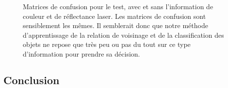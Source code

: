 \documentclass[a4paper, onecolumn, 11pt]{article}
\begin{document}
\begin{figure}[p]
    \centering
    \qquad
    \caption{Matrices de confusion pour le test, avec et sans l'information de couleur et de réflectance laser. Les matrices de confusion sont sensiblement les mêmes. Il semblerait donc que notre méthode d'apprentissage de la relation de voisinage et de la classification des objets ne repose que très peu ou pas du tout sur ce type d'information pour prendre sa décision.}
    \label{fig:laser_color}
\end{figure}



\subsection{Conclusion}
\end{document}
